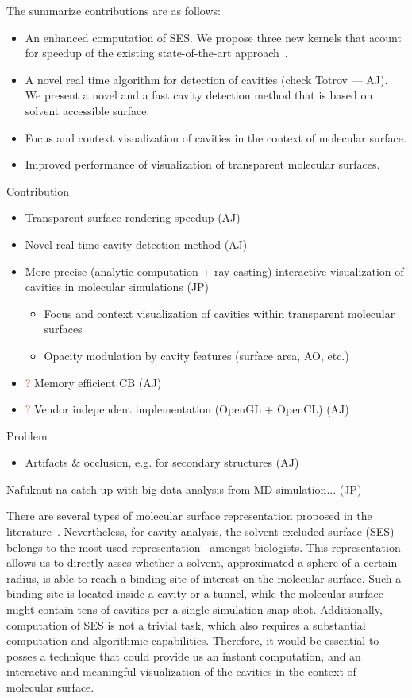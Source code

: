 The summarize contributions are as follows:
\begin{itemize}
  \item An enhanced computation of SES. We propose three new kernels that acount for speedup of the existing state-of-the-art approach~\cite{todo}.
  \item A novel real time algorithm for detection of cavities (check Totrov --- AJ). We present a novel and a fast cavity detection method that is based on solvent accessible surface.
  \item Focus and context visualization of cavities in the context of molecular surface.
  \item Improved performance of visualization of transparent molecular surfaces.
\end{itemize}

Contribution
\begin{itemize}
  \item Transparent surface rendering speedup (AJ)
	\item Novel real-time cavity detection method (AJ)
	\item More precise (analytic computation + ray-casting) interactive visualization of cavities in molecular simulations (JP)
	\begin{itemize}
		\item Focus and context visualization of cavities within transparent molecular surfaces
		\item Opacity modulation by cavity features (surface area, AO, etc.)
	\end{itemize}
	\item \textcolor{red}{?} Memory efficient CB (AJ)
	\item \textcolor{red}{?} Vendor independent implementation (OpenGL + OpenCL) (AJ)
\end{itemize}

Problem
\begin{itemize}
  \item Artifacts \& occlusion, e.g. for secondary structures (AJ)
\end{itemize}

Nafuknut na catch up with big data analysis from MD simulation... (JP)

There are several types of molecular surface representation proposed in the literature~\cite{STAR2015}. Nevertheless, for cavity analysis,  the solvent-excluded surface (SES) belongs to the most used representation~\cite{todo} amongst biologists. This representation allows us to directly asses whether a solvent, approximated a sphere of a certain radius, is able to reach a binding site of interest on the molecular surface. Such a binding site is located inside a cavity or a tunnel, while the molecular surface might contain tens of cavities per a single simulation snap-shot. Additionally, computation of SES is not a trivial task, which also requires a substantial computation and algorithmic capabilities. Therefore, it would be essential to posses a technique that could provide us an instant computation, and an interactive and meaningful visualization of the cavities in the context of molecular surface.


